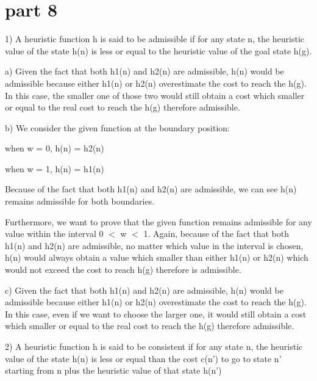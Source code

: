 \documentclass{article}
\begin{document}
\section*{part 8}

\hspace{5mm} 

1) A heuristic function h is said to be admissible if for any state n, the heuristic value of the state h{\small (n)} is less or equal to the heuristic value of the goal state h{\small (g)}.

a) Given the fact that both h{\small 1(n)} and h{\small 2(n)} are admissible, h{\small (n)} would be admissible because either h{\small 1(n)} or h{\small 2(n)} overestimate the cost to reach the h{\small (g)}. In this case, the smaller one of those two would still obtain a cost which smaller or equal to the real cost to reach the h{\small (g)} therefore admissible.

b) We consider the given function at the boundary position:
\begin{center}

when w = 0, h{\small(n)} = h{\small 2(n)}

when w = 1, h{\small(n)} = h{\small 1(n)}

\end{center}

Because of the fact that both h{\small 1(n)} and h{\small 2(n)} are admissible, we can see h{\small(n)} remains admissible for both boundaries.

Furthermore, we want to prove that the given function remains admissible for any value within the interval 0 $<$ w $<$ 1. Again, because of the fact that both h{\small 1(n)} and h{\small 2(n)} are admissible, no matter which value in the interval is chosen,  h{\small (n)} would always obtain a value which smaller than either h{\small 1(n)} or h{\small 2(n)} which would not exceed the cost to reach h{\small (g)} therefore is admissible.

c) Given the fact that both h{\small 1(n)} and h{\small 2(n)} are admissible, h{\small (n)} would be admissible because either h{\small 1(n)} or h{\small 2(n)} overestimate the cost to reach the h{\small (g)}. In this case, even if we want to choose the larger one, it would still obtain a cost which smaller or equal to the real cost to reach the h{\small (g)} therefore admissible.

\vspace{5mm}

2) A heuristic function h is said to be consistent if for any state n, the heuristic value of the state h{\small(n)} is less or equal than the cost c{\small(n')} to go to state n' starting from n plus the heuristic value of that state h{\small(n')}
\end{document}
